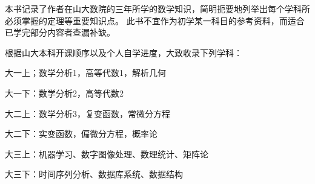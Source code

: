  \vspace*{0.0cm}
\thispagestyle{empty}
\vspace*{2.2cm}
\centerline{\hei{\color{darkblue}{内~容~简~介}}}\vspace{2cm}

本书记录了作者在山大数院的三年所学的数学知识，简明扼要地列举出每个学科所必须掌握的定理等重要知识点。
此书不宜作为初学某一科目的参考资料，而适合已学完部分内容者查漏补缺。

根据山大本科开课顺序以及个人自学进度，大致收录下列学科：

大一上；数学分析1，高等代数1，解析几何

大一下：数学分析2，高等代数2

大二上：数学分析3，复变函数，常微分方程

大二下：实变函数，偏微分方程，概率论

大三上：机器学习、数字图像处理、数理统计、矩阵论

大三下：时间序列分析、数据库系统、数据结构

